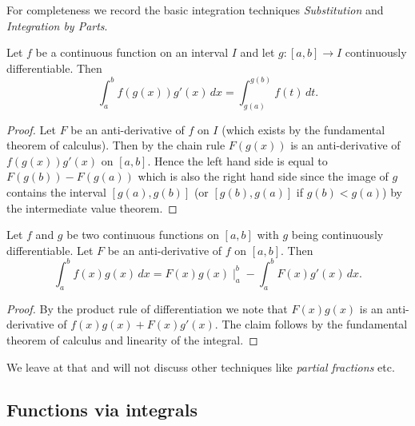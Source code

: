 \documentclass[10pt, a4paper]{article}
\begin{document}
For completeness we record the basic integration techniques \textit{Substitution} and \textit{Integration by Parts}.

\begin{proposition}
    Let $f$ be a continuous function on an interval $I$ and let $g : [a, b] \rightarrow I$ continuously differentiable.
    Then
    \[
    \int_{a}^{b}f(g(x))g'(x)\,dx = \int_{g(a)}^{g(b)}f(t)\,dt.
    \]
    \begin{proof}
        Let $F$ be an anti-derivative of $f$ on $I$
        (which exists by the fundamental theorem of calculus).
        Then by the chain rule $F(g(x))$ is an anti-derivative of $f(g(x))g'(x)$ on $[a, b]$.
        Hence the left hand side is equal to $F(g(b)) - F(g(a))$ which is also the right hand side since the image of $g$ contains the interval $[g(a), g(b)]$
        (or $[g(b), g(a)]$ if $g(b) < g(a)$)
        by the intermediate value theorem.
    \end{proof}
\end{proposition}

\begin{proposition}
    Let $f$ and $g$ be two continuous functions on $[a, b]$ with $g$ being continuously differentiable.
    Let $F$ be an anti-derivative of $f$ on $[a, b]$.
    Then
    \[
    \int_{a}^{b}f(x)g(x)\,dx = F(x)g(x)\mid_{a}^{b} - \int_{a}^{b}F(x)g'(x)\,dx.
    \]
    \begin{proof}
        By the product rule of differentiation we note that $F(x)g(x)$ is an anti-derivative of $f(x)g(x) + F(x)g'(x)$.
        The claim follows by the fundamental theorem of calculus and linearity of the integral.
    \end{proof}
\end{proposition}

We leave at that and will not discuss other techniques like \textit{partial fractions} etc.

\subsection{Functions via integrals}
\end{document}

